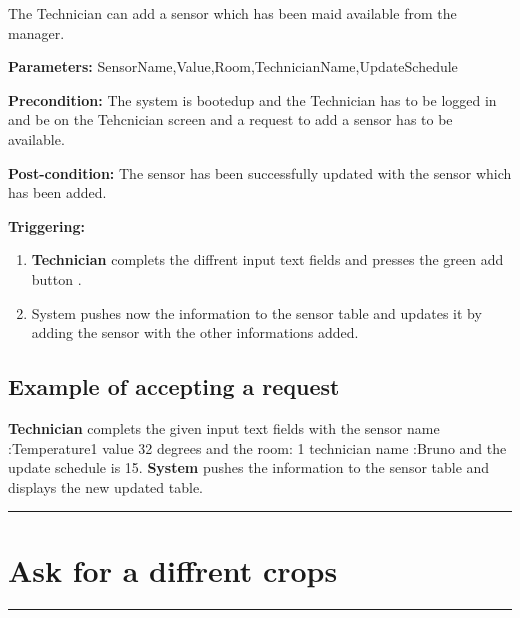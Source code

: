 The Technician can add a sensor which has been maid available from the manager.
\begin{description}
\item \textbf{Parameters:} SensorName,Value,Room,TechnicianName,UpdateSchedule
\item \textbf{Precondition:} The system is bootedup and the Technician has to be
logged in and be on the Tehcnician screen and a request to add a sensor has to
be available.
\item \textbf{Post-condition:} The sensor has been successfully updated with the
sensor which has been added.
\item \textbf{Triggering:}
\begin{enumerate}
\item \textbf{Technician} complets the diffrent input text fields and presses
the green add button .
\item System pushes now the information to the sensor table and updates it by
adding the sensor with the other informations added.
\end{enumerate}
\end{description}

\subsection{Example of accepting a request}
\textbf{Technician} complets the given input text fields with the sensor name
:Temperature1 value 32 degrees and the room: 1 technician name :Bruno and the
update schedule is 15. \textbf{System} pushes the information to the sensor
table and displays the new updated table.
\hfill
\vspace{0.5cm}
\hrule




\section{Ask for a diffrent crops}

\hrule
\hfill
\vspace{0.5cm}

\label{operation:Ask for a diffrent crop}

